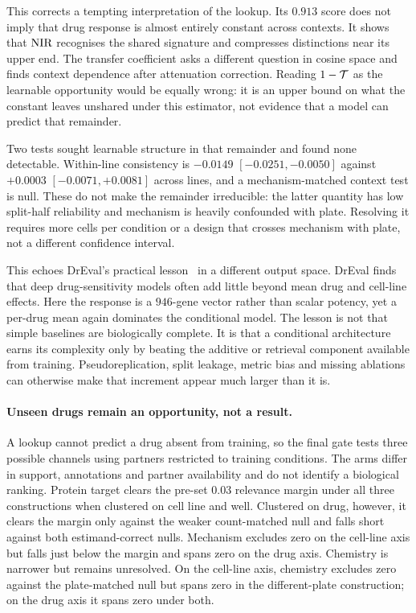 This corrects a tempting interpretation of the lookup. Its $0.913$ score does not imply that drug
response is almost entirely constant across contexts. It shows that $\textrm{NIR}$ recognises the shared
signature and compresses distinctions near its upper end. The transfer coefficient asks a different
question in cosine space and finds context dependence after attenuation correction. Reading
$1-\mathcal{T}$ as the learnable opportunity would be equally wrong: it is an upper bound on what the
constant leaves unshared under this estimator, not evidence that a model can predict that remainder.

Two tests sought learnable structure in that remainder and found none detectable. Within-line
consistency is $-0.0149$ \nolinebreak[3]$[-0.0251,-0.0050]$ against $+0.0003$
\nolinebreak[3]$[-0.0071,+0.0081]$ across lines, and a mechanism-matched context test is null. These
do not make the remainder irreducible: the latter quantity has low split-half reliability and
mechanism is heavily confounded with plate. Resolving it requires more cells per condition or a
design that crosses mechanism with plate, not a different confidence interval.

This echoes DrEval's practical lesson~\cite{dreval} in a different output space. DrEval finds that
deep drug-sensitivity models often add little beyond mean drug and cell-line effects. Here the
response is a $946$-gene vector rather than scalar potency, yet a per-drug mean again dominates the
conditional model. The lesson is not that simple baselines are biologically complete. It is that a
conditional architecture earns its complexity only by beating the additive or retrieval component
available from training. Pseudoreplication, split leakage, metric bias and missing ablations can
otherwise make that increment appear much larger than it is.

\paragraph{Unseen drugs remain an opportunity, not a result.} A lookup cannot predict a drug absent
from training, so the final gate tests three possible channels using partners restricted to training
conditions. The arms differ in support, annotations and partner availability and do not identify a
biological ranking. Protein target clears the pre-set $0.03$ relevance margin under all three
constructions when clustered on cell line and well. Clustered on drug, however, it clears the
margin only against the weaker count-matched null and falls short against both estimand-correct
nulls. Mechanism excludes zero on the cell-line axis but falls just below the margin and spans zero
on the drug axis. Chemistry is narrower but remains unresolved. On the cell-line axis, chemistry
excludes zero against the plate-matched null but spans zero in the different-plate construction; on
the drug axis it spans zero under both.

